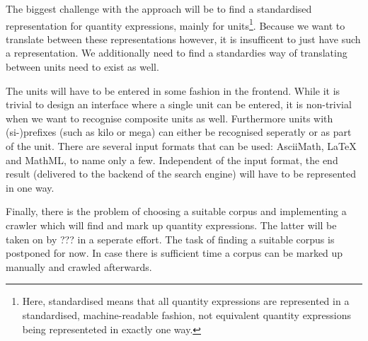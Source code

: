 \documentclass[11pt]{article}
\begin{document}
The biggest challenge with the approach will be to find a standardised representation for quantity expressions, mainly for units\footnote{Here, standardised means that all quantity expressions are represented in a standardised, machine-readable fashion, not equivalent quantity expressions being representeted in exactly one way. }. Because we want to translate between these representations however, it is insufficent to just have such a representation. We additionally need to find a standardies way of translating between units need to exist as well.


The units will have to be entered in some fashion in the frontend. While it is trivial to design an interface where a single unit can be entered, it is non-trivial when we want to recognise composite units as well. Furthermore units with (si-)prefixes (such as kilo or mega) can either be recognised seperatly or as part of the unit. There are several input formats that can be used: AsciiMath, \LaTeX{} and MathML, to name only a few. Independent of the input format, the end result (delivered to the backend of the search engine) will have to be represented in one way.

Finally, there is the problem of choosing a suitable corpus and implementing a crawler which will find and mark up quantity expressions. The latter will be taken on by ??? in a seperate effort. The task of finding a suitable corpus is postponed for now. In case there is sufficient time a corpus can be marked up manually and crawled afterwards.


{}
\end{document}
